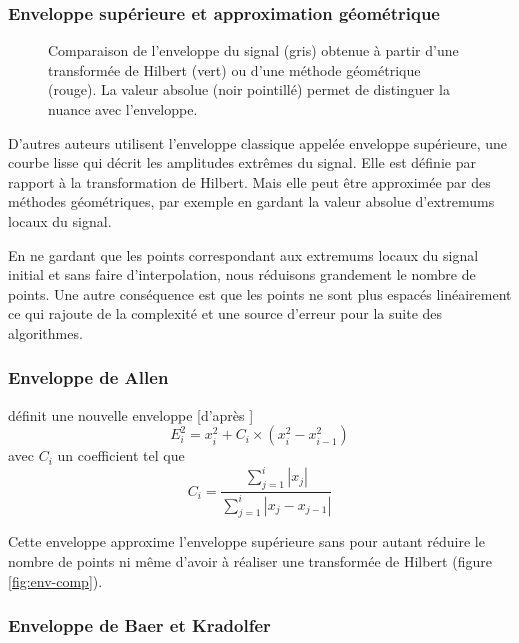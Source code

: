 \documentclass[a4paper, 11pt]{article} %
\begin{document}
\subsubsection{Enveloppe supérieure et approximation géométrique}

\begin{figure}[!ht]
    \centering
    \scalebox{1}{}
    \caption{Comparaison de l'enveloppe du signal (gris) obtenue à partir d'une transformée de Hilbert (vert) ou d'une méthode géométrique (rouge). La valeur absolue (noir pointillé) permet de distinguer la nuance avec l'enveloppe.}
    \label{fig:env-approx}
\end{figure}

D'autres auteurs utilisent l'enveloppe classique appelée enveloppe supérieure, une courbe lisse qui décrit les amplitudes extrêmes du signal. Elle est définie par rapport à la transformation de Hilbert. Mais elle peut être approximée par des méthodes géométriques, par exemple en gardant la valeur absolue d'extremums locaux du signal. 

En ne gardant que les points correspondant aux extremums locaux du signal initial et sans faire d'interpolation, nous réduisons grandement le nombre de points. Une autre conséquence est que les points ne sont plus espacés linéairement ce qui rajoute de la complexité et une source d'erreur pour la suite des algorithmes.

\subsubsection{Enveloppe de Allen}

\cite{allen1982} définit une nouvelle enveloppe [d'après \cite{kuperkoch2010}]
\begin{equation}
   E_i^2 = x_i^2 + C_i \times (x_i^2-x_{i-1}^2)
\end{equation}
avec $C_i$ un coefficient tel que
\begin{equation}
   C_i = \frac{\sum_{j=1}^{i}{|x_j|}}{\sum_{j=1}^{i}{|x_j-x_{j-1}|}}
\end{equation}

Cette enveloppe approxime l'enveloppe supérieure sans pour autant réduire le nombre de points ni même d'avoir à réaliser une transformée de Hilbert (figure \ref{fig:env-comp}).

\subsubsection{Enveloppe de Baer et Kradolfer}
\end{document}
